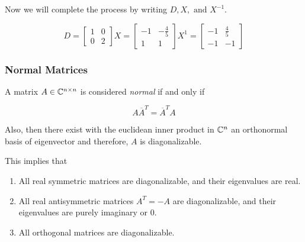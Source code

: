 Now we will complete the process by writing \(D, X, \text{ and } X^{-1}\).

\[
    D = \begin{bmatrix}
        1 & 0 \\
        0 & 2
    \end{bmatrix}
    X = \begin{bmatrix}
        -1  & -\frac{4}{5} \\
        1   &   1 
    \end{bmatrix}
    X^{1} = \begin{bmatrix}
        -1  & \frac{4}{5} \\
        -1   &   -1 
    \end{bmatrix}
\]

\subsubsection{Normal Matrices}

A matrix \(A \in \mathbb{C}^{n \times n}\) is considered \emph{normal} if and only if 

\[
    A \overline{A}^{T} = \overline{A}^T A
\]  

Also, then there exist with the euclidean inner product in \(\mathbb{C}^n\) an orthonormal basis 
of eigenvector and therefore, \(A\) is diagonalizable.

This implies that

\begin{enumerate}
    
    \item All real symmetric matrices are diagonalizable, and their eigenvalues are real.
    
    \item All real antisymmetric matrices \(A^T = -A\) are diagonalizable, and their eigenvalues are 
          purely imaginary or 0. 

    \item All orthogonal matrices are diagonalizable.

\end{enumerate}

